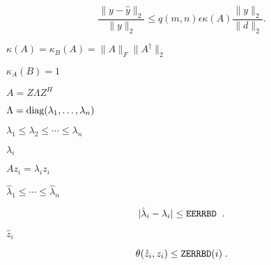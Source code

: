 {\newpage\clearpage
{}%
\begin{displaymath}
  \frac{ \| y - \widehat {y} \|_2 }{ \| y \|_2 } \leq q(m,n)\epsilon
         \kappa(A)\frac{ \| y \|_2 }{ \| d \|_2 } .
\end{displaymath}%
\lthtmldisplayZ
\lthtmlcheckvsize\clearpage}

{\newpage\clearpage
{}%
$\kappa(A) = \kappa_B(A) =  \| A \|_F  \| A^\dagger \|_2 $%
\lthtmlinlinemathZ
\lthtmlcheckvsize\clearpage}

{\newpage\clearpage
{}%
$\kappa_A(B) = 1$%
\lthtmlinlinemathZ
\lthtmlcheckvsize\clearpage}

{\newpage\clearpage
{}%
$A= Z \Lambda Z^H$%
\lthtmlinlinemathZ
\lthtmlcheckvsize\clearpage}

{\newpage\clearpage
{}%
$\Lambda = {\mbox {\rm diag}}( \lambda_1 , \ldots , \lambda_n )$%
\lthtmlinlinemathZ
\lthtmlcheckvsize\clearpage}

{\newpage\clearpage
{}%
$\lambda_1 \leq \lambda_2 \leq \cdots \leq \lambda_n$%
\lthtmlinlinemathZ
\lthtmlcheckvsize\clearpage}

{\newpage\clearpage
{}%
$\lambda_i$%
\lthtmlinlinemathZ
\lthtmlcheckvsize\clearpage}

{\newpage\clearpage
{}%
$A z_i = \lambda_i z_i$%
\lthtmlinlinemathZ
\lthtmlcheckvsize\clearpage}

{\newpage\clearpage
{}%
$\hat{\lambda}_1 \leq \cdots \leq \hat{\lambda}_n$%
\lthtmlinlinemathZ
\lthtmlcheckvsize\clearpage}

{\newpage\clearpage
{}%
\begin{displaymath}
| \hat{\lambda}_i - \lambda_i | \leq {\tt EERRBD} \; \; .
\end{displaymath}%
\lthtmldisplayZ
\lthtmlcheckvsize\clearpage}

{\newpage\clearpage
{}%
$\hat{z}_i$%
\lthtmlinlinemathZ
\lthtmlcheckvsize\clearpage}

{\newpage\clearpage
{}%
\begin{displaymath}
\theta ( \hat{z}_i , z_i ) \leq {\tt ZERRBD} (i) \; .
\end{displaymath}%
\lthtmldisplayZ
\lthtmlcheckvsize\clearpage}

